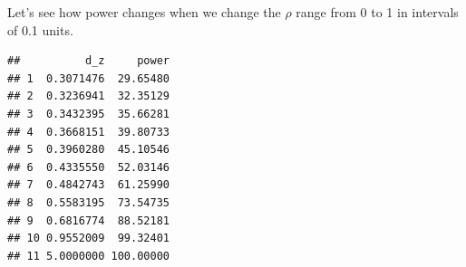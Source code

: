 \documentclass[
]{book}
\newenvironment{Shaded}{\begin{snugshade}}{\end{snugshade}}
\newcommand{\AttributeTok}[1]{\textcolor[rgb]{0.13,0.29,0.53}{#1}}
\newcommand{\DecValTok}[1]{\textcolor[rgb]{0.00,0.00,0.81}{#1}}
\newcommand{\FloatTok}[1]{\textcolor[rgb]{0.00,0.00,0.81}{#1}}
\newcommand{\FunctionTok}[1]{\textcolor[rgb]{0.13,0.29,0.53}{\textbf{#1}}}
\newcommand{\NormalTok}[1]{#1}
\newcommand{\OtherTok}[1]{\textcolor[rgb]{0.56,0.35,0.01}{#1}}
\newcommand{\SpecialCharTok}[1]{\textcolor[rgb]{0.81,0.36,0.00}{\textbf{#1}}}
\newcommand{\StringTok}[1]{\textcolor[rgb]{0.31,0.60,0.02}{#1}}
\begin{document}
Let's see how power changes when we change the \(\rho\) range from 0 to 1 in intervals of 0.1 units.

\begin{Shaded}
\end{Shaded}

\begin{verbatim}
##          d_z     power
## 1  0.3071476  29.65480
## 2  0.3236941  32.35129
## 3  0.3432395  35.66281
## 4  0.3668151  39.80733
## 5  0.3960280  45.10546
## 6  0.4335550  52.03146
## 7  0.4842743  61.25990
## 8  0.5583195  73.54735
## 9  0.6816774  88.52181
## 10 0.9552009  99.32401
## 11 5.0000000 100.00000
\end{verbatim}

\begin{Shaded}
\end{Shaded}
\end{document}
